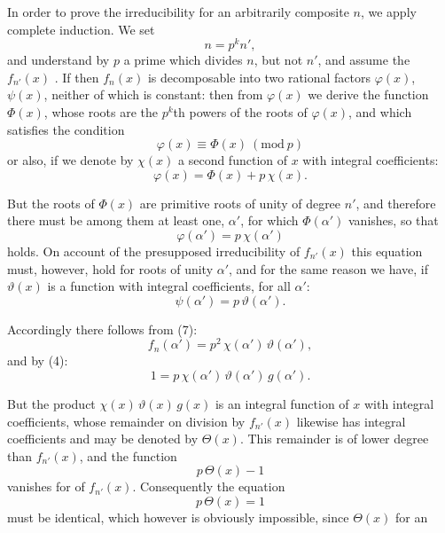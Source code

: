 
In order to prove the irreducibility for an arbitrarily composite $n$,
we apply complete induction. We set
\[
n = p^k n',
\]
and understand by $p$ a prime which divides $n$, but not $n'$, and
assume the  $f_{n'}(x)$ . If
then $f_n(x)$ is decomposable into two rational factors
$\varphi(x)$, $\psi(x)$, neither of which is constant:
then from $\varphi(x)$ we derive the function $\Phi(x)$, whose roots
are the $p^{k}$th powers of the roots of $\varphi(x)$, and which satisfies the condition
\[
\varphi(x) \equiv \Phi(x) \ (\mathrm{mod}\ p)
\]
or also, if we denote by $\chi(x)$ a second function of $x$ with
integral coefficients:
\[
\varphi(x) = \Phi(x) + p\, \chi(x).
\]

But the roots of $\Phi(x)$ are primitive roots of unity of degree
$n'$, and therefore there must be among them at least one,
$\alpha'$, for which $\Phi(\alpha')$ vanishes, so that
\[
\varphi(\alpha') = p\, \chi(\alpha')
\]
holds. On account of the presupposed irreducibility of $f_{n'}(x)$
this equation must, however, hold for  roots of unity $\alpha'$, and
for the same reason we have, if $\vartheta(x)$ is a function with
integral coefficients, for all $\alpha'$:
\[
\psi(\alpha') = p\, \vartheta(\alpha').
\]

Accordingly there follows from (7):
\[
f_n(\alpha') = p^2\, \chi(\alpha')\, \vartheta(\alpha'),
\]
and by (4):
\[
1 = p\, \chi(\alpha')\, \vartheta(\alpha')\, g(\alpha').
\]

But the product $\chi(x)\, \vartheta(x)\, g(x)$ is an integral
function of $x$ with integral coefficients, whose remainder on division by $f_{n'}(x)$ likewise has integral coefficients and may be
denoted by $\Theta(x)$. This remainder is of lower degree than $f_{n'}(x)$, and the
function
\[
p\, \Theta(x) - 1
\]
vanishes for  of $f_{n'}(x)$. Consequently the
equation
\[
p\, \Theta(x) = 1
\]
must be identical, which however is obviously impossible, since $\Theta(x)$ for an
